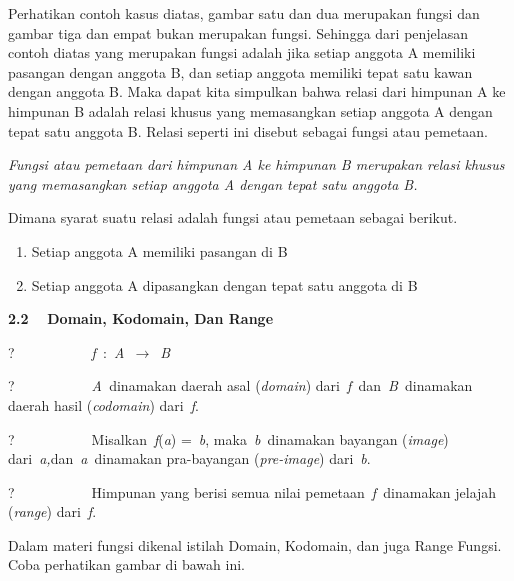 \documentclass[11pt,fleqn]{book} %
\begin{document}
\begin{myEnumerate}
\begin{itemize}
\noindent 

\noindent Perhatikan contoh kasus diatas, gambar satu dan dua merupakan fungsi dan gambar tiga dan empat bukan merupakan fungsi. Sehingga dari penjelasan contoh diatas yang merupakan fungsi adalah jika setiap anggota A memiliki pasangan dengan anggota B, dan setiap anggota memiliki tepat satu kawan dengan anggota B. Maka dapat kita simpulkan bahwa relasi dari himpunan A ke himpunan B adalah relasi khusus yang memasangkan setiap anggota A dengan tepat satu anggota B. Relasi seperti ini disebut sebagai fungsi atau pemetaan.

\noindent \textit{Fungsi atau pemetaan dari himpunan A ke himpunan B merupakan relasi khusus yang memasangkan setiap anggota A dengan tepat satu anggota B.}

\noindent Dimana syarat suatu relasi adalah fungsi atau pemetaan sebagai berikut.

\begin{enumerate}
\item  Setiap anggota A memiliki pasangan di B

\item  Setiap anggota A dipasangkan dengan tepat satu anggota di B
\end{enumerate}

\noindent 

\noindent 

\noindent 

\noindent 

\noindent \textbf{2.2 }~~\textbf{Domain, Kodomain, Dan Range}

\noindent \textbf{}

\noindent ?~~~~~~~~~~~\textit{f~}:~\textit{A~}$\mathrm{\to}$~\textit{B}

\noindent ?~~~~~~~~~~~\textit{A~}dinamakan daerah asal (\textit{domain}) dari~\textit{f~}dan~\textit{B~}dinamakan daerah hasil (\textit{codomain}) dari~\textit{f}.

\noindent ?~~~~~~~~~~~Misalkan~\textit{f}(\textit{a}) =~\textit{b}, maka~\textit{b~}dinamakan bayangan (\textit{image}) dari~\textit{a,}dan~\textit{a~}dinamakan pra-bayangan (\textit{pre-image}) dari~\textit{b}.

\noindent ?~~~~~~~~~~~Himpunan yang berisi semua nilai pemetaan~\textit{f~}dinamakan jelajah (\textit{range}) dari~\textit{f}.

\noindent 

\noindent Dalam materi fungsi dikenal istilah Domain, Kodomain, dan juga Range Fungsi. Coba perhatikan gambar di bawah ini.


\end{itemize}
\end{myEnumerate}
\end{document}
